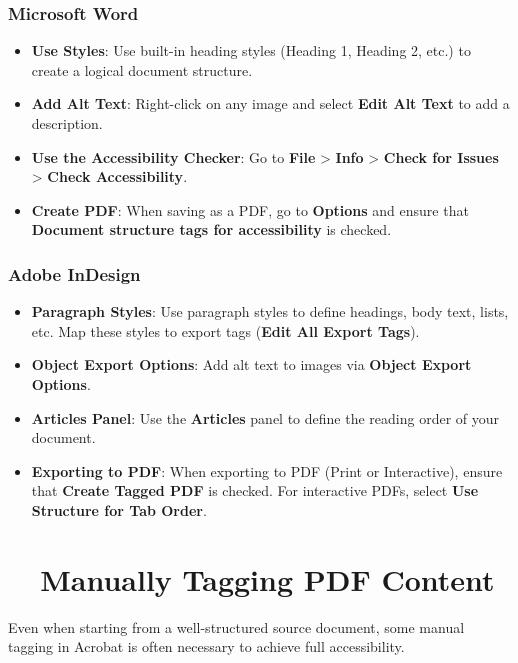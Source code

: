 \subsubsection{Microsoft Word}
\label{ssubsec:ms-word-pdf}
\begin{itemize}
	\item \textbf{Use Styles}: Use built-in heading styles (Heading 1, Heading 2, etc.) to create a logical document structure.
	\item \textbf{Add Alt Text}: Right-click on any image and select \textbf{Edit Alt Text} to add a description.
	\item \textbf{Use the Accessibility Checker}: Go to \textbf{File} > \textbf{Info} > \textbf{Check for Issues} > \textbf{Check Accessibility}.
	\item \textbf{Create PDF}: When saving as a PDF, go to \textbf{Options} and ensure that \textbf{Document structure tags for accessibility} is checked.
\end{itemize}

\subsubsection{Adobe InDesign}
\label{ssubsec:adobe-indesign-pdf}
\begin{itemize}
	\item \textbf{Paragraph Styles}: Use paragraph styles to define headings, body text, lists, etc. Map these styles to export tags (\textbf{Edit All Export Tags}).
	\item \textbf{Object Export Options}: Add alt text to images via \textbf{Object Export Options}.
	\item \textbf{Articles Panel}: Use the \textbf{Articles} panel to define the reading order of your document.
	\item \textbf{Exporting to PDF}: When exporting to PDF (Print or Interactive), ensure that \textbf{Create Tagged PDF} is checked. For interactive PDFs, select \textbf{Use Structure for Tab Order}.
\end{itemize}

\section{~~Manually Tagging PDF Content}
\label{sec:manual-tagging-pdf}
Even when starting from a well-structured source document, some manual tagging in Acrobat is often necessary to achieve full accessibility.

